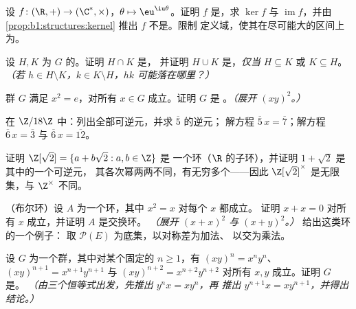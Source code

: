 \begin{exercise}[$\star\star$]\label{exo:b1:structures:5}
设 $f \colon (\R, +) \to (\C^*, \times)$，$\theta \mapsto
\eu^{\iu\theta}$。证明 $f$ 是，求 $\ker f$ 与
$\operatorname{im} f$，并由
\cref{prop:b1:structures:kernel} 推出 $f$ 不是。限制
定义域，使其在尽可能大的区间上为。
\end{exercise}

\begin{exercise}[$\star\star$]\label{exo:b1:structures:6}
设 $H, K$ 为 $G$ 的。证明 $H \cap K$ 是，
并证明 $H \cup K$ 是，\emph{仅当} $H \subseteq K$ 或
$K \subseteq H$。\emph{（若 $h \in H \setminus K$，$k \in K
\setminus H$，$hk$ 可能落在哪里？）}
\end{exercise}

\begin{exercise}[$\star\star$]\label{exo:b1:structures:7}
群 $G$ 满足 $x^2 = e$，对所有 $x \in G$ 成立。证明 $G$ 是
。\emph{（展开 $(xy)^2$。）}
\end{exercise}

\begin{exercise}[$\star\star$]\label{exo:b1:structures:8}
在 $\Z/18\Z$ 中：列出全部可逆元，并求 $\overline 5$ 的逆元；
解方程 $\overline 5\, x = \overline 7$；解方程 $\overline 6\, x =
\overline 3$ 与 $\overline 6\, x = \overline{12}$。
\end{exercise}

\begin{exercise}[$\star\star$]\label{exo:b1:structures:9}
证明 $\Z[\sqrt 2] = \{a + b\sqrt 2 : a, b \in \Z\}$ 是
一个环（$\R$ 的子环），并证明 $1 + \sqrt 2$ 是其中的一个可逆元，
其各次幂两两不同，有无穷多个——因此 $\Z[\sqrt 2]^\times$
是无限集，与 $\Z^\times$ 不同。
\end{exercise}

\begin{exercise}[$\star\star\star$]\label{exo:b1:structures:10}
（布尔环）设 $A$ 为一个环，其中 $x^2 = x$ 对每个 $x$ 都成立。
证明 $x + x = 0$ 对所有 $x$ 成立，并证明 $A$ 是交换环。
\emph{（展开 $(x+x)^2$ 与 $(x+y)^2$。）} 给出这类环的一个例子：
取 $\mathcal{P}(E)$ 为底集，以对称差为加法、
以交为乘法。
\end{exercise}

\begin{exercise}[$\star\star\star$]\label{exo:b1:structures:11}
设 $G$ 为一个群，其中对某个固定的 $n \geq 1$，有 $(xy)^n =
x^n y^n$、$(xy)^{n+1} = x^{n+1}y^{n+1}$ 与 $(xy)^{n+2} =
x^{n+2}y^{n+2}$ 对所有 $x, y$ 成立。证明 $G$ 是。
\emph{（由三个恒等式出发，先推出 $y^n x = x y^n$，再
推出 $y^{n+1} x = x y^{n+1}$，并得出结论。）}
\end{exercise}

